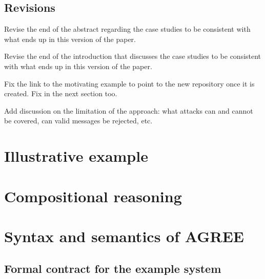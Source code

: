 \documentclass[global,twocolumn]{svjour}
\newif\ifREVISIONS
\begin{document}
\subsection{Revisions}
\begin{compactitem}
  \item Revise the end of the abstract regarding the case studies to be consistent with what ends up in this version of the paper.
  \item Revise the end of the introduction that discusses the case studies to be consistent with what ends up in this version of the paper.
  \item Fix the link to the motivating example to point to the new repository once it is created. Fix in the next section too.
  \item Add discussion on the limitation of the approach: what attacks can and cannot be covered, can valid messages be rejected, etc.
\end{compactitem}
\fi

\section{Illustrative example}
\label{sec:example}


\section{Compositional reasoning}
\label{sec:agree}


\section{Syntax and semantics of AGREE}
\label{agree-semantics}


\subsection{Formal contract for the example system}


\ifREVISIONS
\subsection{Revisions}
\begin{compactitem}
  \item \sout{Add in the AGREE specification for the system}
  \item \sout{Add in the AGREE verification conditions (e.g., similar to those in the Scheduled Components NFM submission)}
  \item \sotu{Add reference to the Liskov principle of safe-substitution when stating that the system contract is a sound abstraction of the implementation.}
  \item Add back in a few sentences on the contract for the filter since those have been removed with the addition of the formal definitions.
\end{compactitem}
\fi
\end{document}
